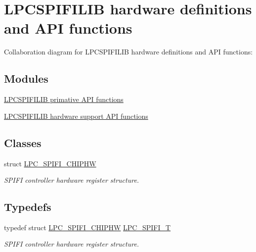 \hypertarget{group___l_p_c_s_p_i_f_i_l_i_b___h_w___a_p_i}{}\section{L\+P\+C\+S\+P\+I\+F\+I\+L\+IB hardware definitions and A\+PI functions}
\label{group___l_p_c_s_p_i_f_i_l_i_b___h_w___a_p_i}
Collaboration diagram for L\+P\+C\+S\+P\+I\+F\+I\+L\+IB hardware definitions and A\+PI functions\+:
\subsection*{Modules}
\begin{DoxyCompactItemize}
\item 
\hyperlink{group___l_p_c_s_p_i_f_i_l_i_b___h_w___p_r_i_m}{L\+P\+C\+S\+P\+I\+F\+I\+L\+I\+B primative A\+P\+I functions}
\item 
\hyperlink{group___l_p_c_s_p_i_f_i_l_i_b___h_w___l2}{L\+P\+C\+S\+P\+I\+F\+I\+L\+I\+B hardware support A\+P\+I functions}
\end{DoxyCompactItemize}
\subsection*{Classes}
\begin{DoxyCompactItemize}
\item 
struct \hyperlink{struct_l_p_c___s_p_i_f_i___c_h_i_p_h_w}{L\+P\+C\+\_\+\+S\+P\+I\+F\+I\+\_\+\+C\+H\+I\+P\+HW}
\begin{DoxyCompactList}\small\item\em S\+P\+I\+FI controller hardware register structure. \end{DoxyCompactList}\end{DoxyCompactItemize}
\subsection*{Typedefs}
\begin{DoxyCompactItemize}
\item 
typedef struct \hyperlink{struct_l_p_c___s_p_i_f_i___c_h_i_p_h_w}{L\+P\+C\+\_\+\+S\+P\+I\+F\+I\+\_\+\+C\+H\+I\+P\+HW} \hyperlink{group___l_p_c_s_p_i_f_i_l_i_b___h_w___a_p_i_ga69ca4e6bace5ac7e7a2ae3cdc0d569b3}{L\+P\+C\+\_\+\+S\+P\+I\+F\+I\+\_\+T}
\begin{DoxyCompactList}\small\item\em S\+P\+I\+FI controller hardware register structure. \end{DoxyCompactList}\end{DoxyCompactItemize}


